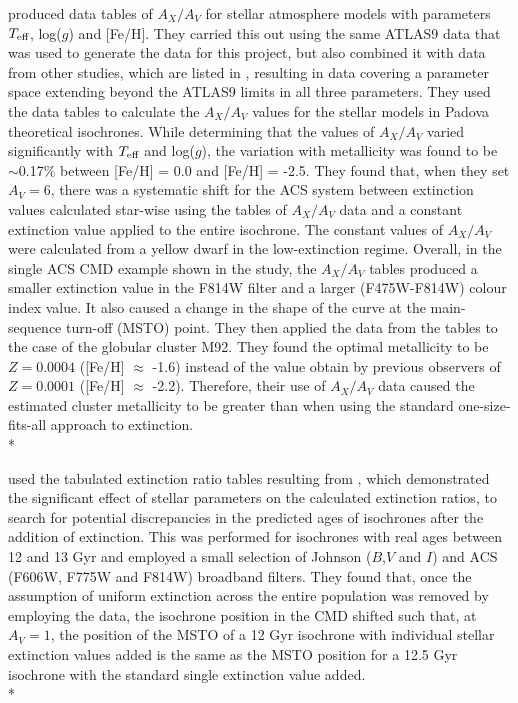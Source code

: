 \documentclass[12pt, a4paper]{report}
\begin{document}
\cite{2008PASP..120..583G} produced data tables of $A_{X}/A_{V}$ for stellar atmosphere models with parameters $T_{\textnormal{eff}}$, log($g$) and [Fe/H]. They carried this out using the same ATLAS9 data \citep{2004astro.ph..5087C} that was used to generate the data for this project, but also combined it with data from other studies, which are listed in \cite{2002A&A...391..195G}, resulting in data covering a parameter space extending beyond the ATLAS9 limits in all three parameters. They used the data tables to calculate the $A_{X}/A_{V}$ values for the stellar models in Padova theoretical isochrones. While determining that the values of $A_{X}/A_{V}$ varied significantly with $T_{\textnormal{eff}}$ and log($g$), the variation with metallicity was found to be $\sim$0.17$\%$ between [Fe/H] = 0.0 and [Fe/H] = -2.5. They found that, when they set $A_{V} = 6$, there was a systematic shift for the ACS system between extinction values calculated star-wise using the tables of $A_{X}/A_{V}$ data and a constant extinction value applied to the entire isochrone. The constant values of $A_{X}/A_{V}$ were calculated from a yellow dwarf in the low-extinction regime. Overall, in the single ACS CMD example shown in the study, the $A_{X}/A_{V}$ tables produced a smaller extinction value in the F814W filter and a larger (F475W-F814W) colour index value. It also caused a change in the shape of the curve at the main-sequence turn-off (MSTO) point. They then applied the data from the tables to the case of the globular cluster M92. They found the optimal metallicity to be $Z = 0.0004$ ([Fe/H] $\approx$ -1.6) instead of the value obtain by previous observers of $Z = 0.0001$ ([Fe/H] $\approx$ -2.2). Therefore, their use of $A_{X}/A_{V}$ data caused the estimated cluster metallicity to be greater than when using the standard one-size-fits-all approach to extinction.\\*

\cite{2017Galax...5...28O} used the tabulated extinction ratio tables resulting from \cite{2008PASP..120..583G}, which demonstrated the significant effect of stellar parameters on the calculated extinction ratios, to search for potential discrepancies in the predicted ages of isochrones after the addition of extinction. This was performed for isochrones with real ages between 12 and 13 Gyr and employed a small selection of Johnson ($B$,$V$ and $I$) and ACS (F606W, F775W and F814W) broadband filters. They found that, once the assumption of uniform extinction across the entire population was removed by employing the \cite{2008PASP..120..583G} data, the isochrone position in the CMD shifted such that, at $A_{V} = 1$, the position of the MSTO of a 12 Gyr isochrone with individual stellar extinction values added is the same as the MSTO position for a 12.5 Gyr isochrone with the standard single extinction value added.\\*
\end{document}
